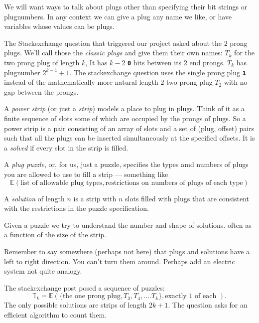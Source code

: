 \documentclass[10pt]{article}
\numberwithin{equation}{section}
\newenvironment{anote}
               {{\textcolor{blue}{Note:}}
                 \itshape
               }
               {}
\newcommand{\plug}[1]{%
\mbox{{\textbf\texttt #1}}
}
\newcommand{\puzzle}[1]{%
   \ensuremath{
   \mathbb{#1}
   }
}
\begin{document}
We will want ways to talk about plugs other than specifying their bit
strings or plugnumbers. In any context we can give a plug any name we
like, or have variables whose values can be plugs.

The Stackexchange question that triggered our project asked about
the $2$ prong plugs. We'll call those the \emph{classic plugs} and give
them their own names: $T_k$ for the two prong plug of length $k$, It
has $k-2$ \plug{0} bits between its $2$ end prongs. $T_k$ has plugnumber $2^{k-1} + 1$.
 The stackexchange question uses the single prong plug \plug{1}{} instead of the mathematically more natural length $2$ two prong plug $T_2$ with no gap between the prongs.
 
 A \emph{power strip} (or just a \emph{strip}) models a place to plug
 in plugs. Think of it as a finite sequence of slots some of
 which are occupied by the prongs of plugs. So a power strip
is a pair consisting of an array of slots and a set of (plug, offset)
pairs such that all the plugs can be inserted simultaneously at
 the specified offsets. It is a \emph{solved} if
 every slot in the strip is filled.

A \emph{plug puzzle}, or, for us, just a puzzle, specifies the types amd numbers of plugs you are allowed to use to fill a strip --- something like
\begin{equation*}
    \puzzle{E}(\text{list of allowable plug types},\text{restrictions on numbers of plugs of each type})
\end{equation*}

A \emph{solution} of length $n$ is a strip with $n$ slots filled with plugs that are consistent with the restrictions in the puzzle specification.


Given a puzzle we try to understand the number and shape of solutions. often as
  a function of the size of the strip.

\begin{anote}
Remember to say somewhere (perhaps not here) that plugs and solutions have a left to right direction. You can't turn them around. Perhaps add an electric system not quite analogy.
\end{anote}

The stackexchange post posed a sequence of puzzles:
\begin{equation*}
\mathbb{T}_k = \puzzle{E}( \{\text{the one prong plug}, T_3, T_4, \ldots. T_k\}, \text{exactly 1 of each } ).
\end{equation*}
The only possible solutions are strips of length $2k+1$. The question asks for an efficient algorithm to count them.
\end{document}
